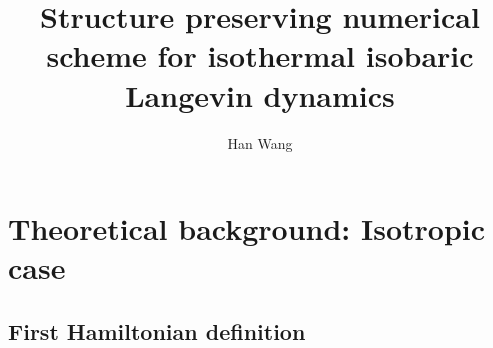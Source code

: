 \documentclass[aps, pre, preprint,unsortedaddress,a4paper,onecolumn]{revtex4}
\begin{document}
\title{Structure preserving numerical scheme for isothermal isobaric Langevin dynamics}
\author{Han Wang}
   
\begin{abstract}
\end{abstract}

\maketitle

\section{Theoretical background: Isotropic case}
\subsection{First Hamiltonian definition}
\end{document}
